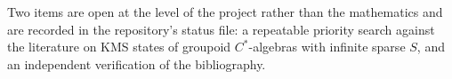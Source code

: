\medskip\noindent
Two items are open at the level of the project rather than the mathematics and are
recorded in the repository's status file: a repeatable priority search against the
literature on KMS states of groupoid $C^*$-algebras with infinite sparse $S$, and an
independent verification of the bibliography.
